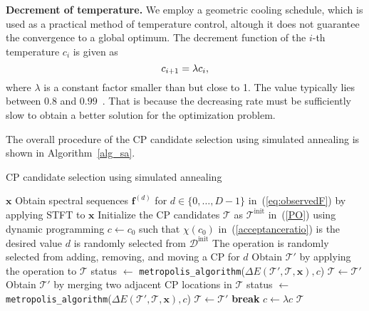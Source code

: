 \textbf{Decrement of temperature.}
%
We employ a geometric cooling schedule, which is used as a practical method of temperature control, altough it does not guarantee the convergence to a global optimum. 
%
The decrement function of the $i$-th temperature $c_i$ is given as
\begin{equation}
  c_{i+1} = \lambda c_i, \notag
\end{equation}
where $\lambda$ is a constant factor smaller than but close to 1. 
%
The value typically lies between $0.8$ and $0.99$~\citep{aarts1989simulated}.
%
That is because the decreasing rate must be sufficiently slow to obtain a better solution for the optimization problem.

The overall procedure of the CP candidate selection using simulated annealing is shown in Algorithm~\ref{alg_sa}.
%
\begin{algorithm}[t] 
  \caption{CP candidate selection using simulated annealing}
  \label{alg_sa}
  \begin{algorithmic}[1]
    \REQUIRE $\bm{x}$
    \STATE Obtain spectral sequences $\bm{f}^{(d)}$ for $d \in \{0, \dots, D-1\}$ in~(\ref{eq:observedF}) by applying STFT to $\bm{x}$
    \STATE Initialize the CP candidates $\bm{\mathcal{T}}$ as $\bm{\mathcal{T}}^{\text{init}}$ in~(\ref{PO}) using dynamic programming
    \STATE $c \leftarrow c_0$ such that $\chi(c_0)$ in~(\ref{acceptanceratio}) is the desired value
        \STATE $d$ is randomly selected from $\mathcal{D}^{\text{init}}$ 
        \STATE The operation is randomly selected from adding, removing, and moving a CP for $d$
        \STATE Obtain $\bm{\mathcal{T}}'$ by applying the operation to $\bm{\mathcal{T}}$
        \STATE status $\leftarrow$ \texttt{metropolis\_algorithm}($\Delta E (\mathcal{T}', \mathcal{T}, \bm{x}), c$) 
          \STATE $\bm{\mathcal{T}} \leftarrow \bm{\mathcal{T}}'$
        \ENDIF
      \ENDWHILE
        \STATE Obtain $\bm{\mathcal{T}}'$ by merging two adjacent CP locations in $\bm{\mathcal{T}}$
        \STATE status $\leftarrow$ \texttt{metropolis\_algorithm}($\Delta E (\mathcal{T}', \mathcal{T}, \bm{x}), c$) 
          \STATE $\bm{\mathcal{T}} \leftarrow \bm{\mathcal{T}}'$
        \ENDIF
          \STATE \textbf{break}
        \ENDIF
        \STATE $c \leftarrow \lambda c$ 
    \ENDWHILE
    \ENSURE $\bm{\mathcal{T}}$
  \end{algorithmic}
\end{algorithm}
